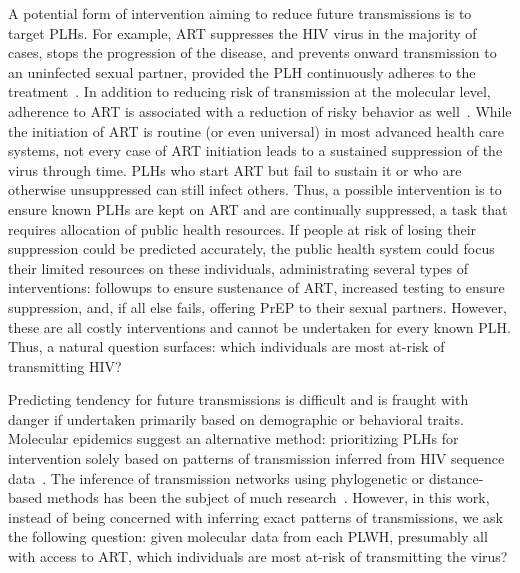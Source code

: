 A potential form of intervention aiming to reduce future transmissions is to target \glspl{PLH}. For example, \gls{ART} suppresses the \gls{HIV} virus in the majority of cases, stops the progression of the disease, and prevents onward transmission to an uninfected sexual partner, provided the \gls{PLH} continuously adheres to the treatment~\cite{Cohen2011}. In addition to reducing risk of transmission at the molecular level, adherence to \gls{ART} is associated with a reduction of risky behavior as well~\cite{Bunnell2006}. While the initiation of \gls{ART} is routine (or even universal) in most advanced health care systems, not every case of \gls{ART} initiation leads to a sustained suppression of the virus through time. \glspl{PLH} who start \gls{ART} but fail to sustain it or who are otherwise unsuppressed can still infect others. Thus, a possible intervention is to ensure known \glspl{PLH} are kept on \gls{ART} and are continually suppressed, a task that requires allocation of public health resources. If people at risk of losing their suppression could be predicted accurately, the public health system could focus their limited resources on these individuals, administrating several types of interventions: followups to ensure sustenance of \gls{ART}, increased testing to ensure suppression, and, if all else fails, offering \gls{PrEP} to their sexual partners. However, these are all costly interventions and cannot be undertaken for every known \gls{PLH}. Thus, a natural question surfaces: which individuals are most at-risk of transmitting \gls{HIV}?

Predicting tendency for future transmissions is difficult and is fraught with danger if undertaken primarily based on demographic or behavioral traits. Molecular epidemics suggest an alternative method: prioritizing \glspl{PLH} for intervention solely based on patterns of transmission inferred from \gls{HIV} sequence data~\cite{Bbosa2019,Villandre2019,Oster2018,Ragonnet-Cronin2019,Wertheim2018,Wertheim2011,Wertheim2014,Smith2009}. The inference of transmission networks using phylogenetic or distance-based methods has been the subject of much research~\cite{Leitner2018,Pond2018,Ragonnet-Cronin2013,Prosperi2011}. However, in this work, instead of being concerned with inferring exact patterns of transmissions, we ask the following question: given molecular data from each \gls{PLWH}, presumably all with access to \gls{ART}, which individuals are most at-risk of transmitting the virus?

